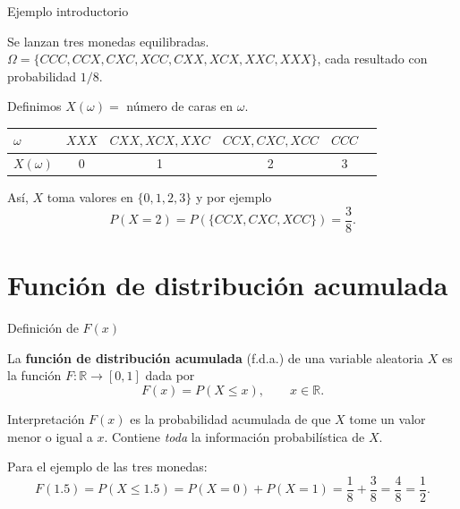 \documentclass[aspectratio=169,11pt]{beamer}
\begin{document}
\begin{frame}{Ejemplo introductorio}
\begin{example}
Se lanzan tres monedas equilibradas. $\Omega = \{CCC, CCX, CXC, XCC, CXX, XCX, XXC, XXX\}$, cada resultado con probabilidad $1/8$.

Definimos $X(\omega) = $ número de caras en $\omega$.

\begin{center}
\begin{tabular}{lccccc}
\toprule
$\omega$ & $XXX$ & $CXX,XCX,XXC$ & $CCX,CXC,XCC$ & $CCC$ \\
\midrule
$X(\omega)$ & 0 & 1 & 2 & 3 \\
\bottomrule
\end{tabular}
\end{center}

Así, $X$ toma valores en $\{0,1,2,3\}$ y por ejemplo
$$P(X=2) = P(\{CCX,CXC,XCC\}) = \frac{3}{8}.$$
\end{example}
\end{frame}

\section{Función de distribución acumulada}

\begin{frame}{Definición de $F(x)$}
\begin{definition}
La \textbf{función de distribución acumulada} (f.d.a.) de una variable aleatoria $X$ es la función $F : \mathbb{R} \to [0,1]$ dada por
$$F(x) = P(X \le x), \qquad x \in \mathbb{R}.$$
\end{definition}

\begin{block}{Interpretación}
$F(x)$ es la probabilidad acumulada de que $X$ tome un valor menor o igual a $x$. Contiene \emph{toda} la información probabilística de $X$.
\end{block}

\begin{example}
Para el ejemplo de las tres monedas:
$$F(1.5) = P(X \le 1.5) = P(X=0) + P(X=1) = \frac{1}{8} + \frac{3}{8} = \frac{4}{8} = \frac{1}{2}.$$
\end{example}
\end{frame}
\end{document}
